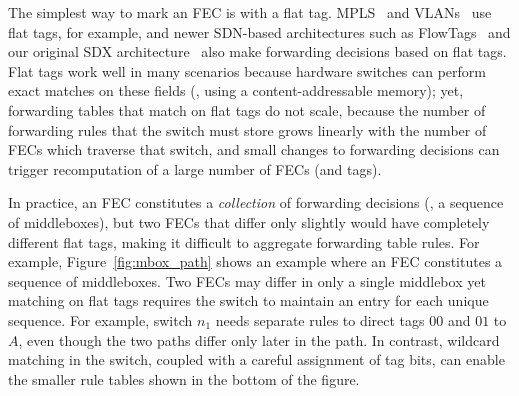 The simplest way to mark an FEC is with a flat tag.  MPLS~\cite{mpls}
and VLANs~\cite{vlan} use flat tags, for example, and newer SDN-based
architectures such as FlowTags~\cite{flowtags} and our original SDX
architecture~\cite{sdx} also make forwarding decisions based on flat
tags.  Flat tags work well in many scenarios because hardware switches
can perform exact matches on these fields (\eg, using a
content-addressable memory); yet, forwarding tables that match on flat
tags do not scale, because the number of forwarding rules that the
switch must store grows linearly with the number of FECs which
traverse that switch, and small changes to forwarding decisions can
trigger recomputation of a large number of FECs (and tags).

In practice, an FEC constitutes a \emph{collection} of forwarding
decisions (\eg, a sequence of middleboxes), but two FECs that differ
only slightly would have completely different flat tags, making it
difficult to aggregate forwarding table rules.  For example,
Figure~\ref{fig:mbox_path} shows an example where an FEC constitutes a
sequence of middleboxes.  Two FECs may differ in only a single
middlebox yet matching on flat tags requires the switch to maintain an
entry for each unique sequence.  For example, switch $n_1$ needs
separate rules to direct tags $00$ and $01$ to $A$, even though the
two paths differ only later in the path.  In contrast, wildcard
matching in the switch, coupled with a careful assignment of tag bits,
can enable the smaller rule tables shown in the bottom of the figure.






